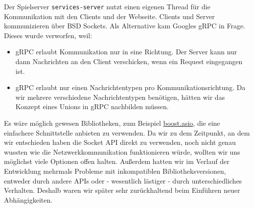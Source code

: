 Der Spielserver \texttt{services-server} nutzt einen eigenen Thread für die Kommunikation mit den Clients und
der Webseite. Clients und Server kommunizieren über BSD Sockets.
Als Alternative kam Googles gRPC in Frage. Dieses wurde verworfen, weil:
\begin{itemize}
    \item gRPC erlaubt Kommunikation nur in eine Richtung. Der Server kann nur dann Nachrichten an den Client verschicken,  wenn ein Request eingegangen ist.
    \item gRPC erlaubt nur einen Nachrichtentypen pro Kommunikationsrichtung. Da wir mehrere verschiedene Nachrichtentypen benötigen, hätten wir das Konzept eines Unions in gRPC nachbilden müssen.
\end{itemize}
Es wäre möglich gewesen Bibliotheken, zum Beispiel \href{http://think-async.com/Asio/WebHome}{boost.asio}, die eine einfachere Schnittstelle anbieten zu verwenden. Da wir zu dem Zeitpunkt, an dem wir entschieden haben die Socket API direkt zu verwenden, noch nicht genau wussten wie die Netzwerkkommunikation funktionieren würde, wollten wir uns möglichst viele Optionen offen halten. Außerdem hatten wir im Verlauf der Entwicklung mehrmals Probleme mit inkompatiblen Bibliotheksversionen, entweder durch andere APIs oder - wesentlich lästiger - durch unterschiedliches Verhalten. Deshalb waren wir später sehr zurückhaltend beim Einführen neuer Abhängigkeiten.

